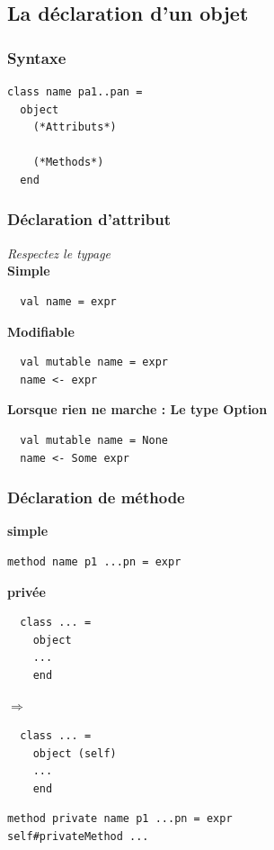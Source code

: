 \subsection{La déclaration d'un objet} %
\begin{frame}[fragile]
	\frametitle{Syntaxe}
	\begin{lstlisting}
class name pa1..pan =
  object
    (*Attributs*)
    
    (*Methods*)
  end
	\end{lstlisting}
\end{frame}

\begin{frame}[fragile]
	\frametitle{Déclaration d'attribut}
	\textit{Respectez le typage}\\
	\textbf{Simple}
	\begin{lstlisting}
  val name = expr
	\end{lstlisting}
	\textbf{Modifiable}
	\begin{lstlisting}
  val mutable name = expr
  name <- expr
	\end{lstlisting}
	\textbf{Lorsque rien ne marche : Le type Option}
	\begin{lstlisting}
  val mutable name = None
  name <- Some expr
	\end{lstlisting}
\end{frame}

\begin{frame}[fragile]
	\frametitle{Déclaration de méthode}
	\textbf{simple}
	\begin{lstlisting}
method name p1 ...pn = expr
	\end{lstlisting}
	\textbf{privée}\\
	\begin{minipage}{0.4\textwidth}
  	\begin{lstlisting}
  class ... =
    object
    ...
    end
		\end{lstlisting}
	\end{minipage}$\Rightarrow$
	\begin{minipage}{0.4\textwidth}
		\begin{lstlisting}
  class ... =
    object (self)
    ...
    end
		\end{lstlisting}
	\end{minipage}
	\begin{lstlisting}
method private name p1 ...pn = expr
self#privateMethod ...
	\end{lstlisting}
\end{frame}

